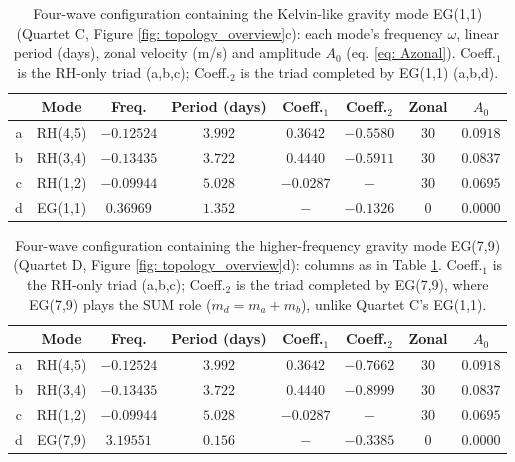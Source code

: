 \begin{table}
    \centering
    \begin{tabular}{|c|c|c|c|c|c|c|c|}\hline
    & Mode  & Freq. & Period (days) & Coeff.$_1$ &  Coeff.$_2$  & Zonal&$A_0$\\\hline
         a &  RH(4,5) &$-0.12524$&$3.992$& $0.3642$ & $-0.5580$ &30&$0.0918$  \\
         b &  RH(3,4) &$-0.13435$&$3.722$& $0.4440$ & $-0.5911$ &30&$0.0837$  \\
         c &  RH(1,2) &$-0.09944$&$5.028$& $-0.0287$ & $-$ &30&$0.0695$  \\
         d &  EG(1,1) &$0.36969$&$1.352$& $-$ & $-0.1326$ &0&$0.0000$  \\
        \hline
    \end{tabular}
    \caption{Four-wave configuration containing the Kelvin-like gravity mode EG(1,1) (Quartet C, Figure \ref{fig: topology_overview}c): each mode's frequency $\omega$, linear period (days), zonal velocity (m/s) and amplitude $A_0$ (eq. \ref{eq: Azonal}). Coeff.$_1$ is the RH-only triad (a,b,c); Coeff.$_2$ is the triad completed by EG(1,1) (a,b,d).}
    \label{tab: cap42}
\end{table}

\begin{table}
    \centering
    \begin{tabular}{|c|c|c|c|c|c|c|c|}\hline
    & Mode  & Freq. & Period (days) & Coeff.$_1$ &  Coeff.$_2$  & Zonal&$A_0$\\\hline
         a &  RH(4,5) &$-0.12524$&$3.992$& $0.3642$ & $-0.7662$ &30&$0.0918$  \\
         b &  RH(3,4) &$-0.13435$&$3.722$& $0.4440$ & $-0.8999$ &30&$0.0837$  \\
         c &  RH(1,2) &$-0.09944$&$5.028$& $-0.0287$ & $-$ &30&$0.0695$  \\
         d &  EG(7,9) &$3.19551$&$0.156$& $-$ & $-0.3385$ &0&$0.0000$  \\
        \hline
    \end{tabular}
    \caption{Four-wave configuration containing the higher-frequency gravity mode EG(7,9) (Quartet D, Figure \ref{fig: topology_overview}d): columns as in Table \ref{tab: cap42}. Coeff.$_1$ is the RH-only triad (a,b,c); Coeff.$_2$ is the triad completed by EG(7,9), where EG(7,9) plays the SUM role ($m_d=m_a+m_b$), unlike Quartet C's EG(1,1).}
    \label{tab: cap43}
\end{table}
